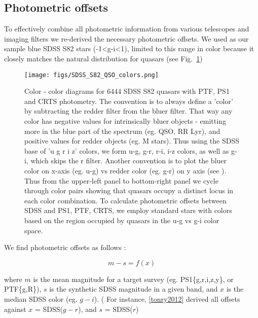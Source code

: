 \documentclass[fleqn,usenatbib]{mnras}  %
\begin{document}
\subsection{Photometric offsets}

To effectively combine all photometric information from various telescopes and imaging filters we re-derived the necessary photometric offsets. We used as our sample blue SDSS S82 stars (-1<g-i<1), limited to this range in color because it closely matches the natural distribution for quasars (see Fig.~\ref{fig:quasar_colors})


\begin{figure}
\texttt{[image: figs/SDSS\_S82\_QSO\_colors.png]}
\caption{Color - color diagrams for 6444 SDSS S82 quasars with PTF, PS1 and CRTS photometry. The convention is to always define a 'color' by subtracting the redder filter from the bluer filter. That way any color has negative values for intrinsically bluer objects - emitting more in the blue part of the spectrum (eg. QSO, RR Lyr), and positive values for redder objects (eg. M stars). Thus using the SDSS base of 'u g r i z' colors,  we form u-g, g-r,  r-i, i-z  colors, as well as g-i, which skips the r filter. Another convention is to plot the bluer color on x-axis (eg. u-g) vs redder color (eg. g-r) on y axis (see \citealt{ivezic2002,sesar2007}). Thus from the upper-left panel to bottom-right panel we cycle through color pairs showing that quasars occupy a distinct locus in each color combination. To calculate photometric offsets between SDSS and PS1, PTF, CRTS, we employ standard stars with colors based on the region occupied by quasars in the u-g vs g-i color space. }
\label{fig:quasar_colors}
\end{figure} 



We find photometric offsets as follows : 

\begin{equation}
m - s = f(x)
\end{equation}

where $m$ is the mean magnitude for a target survey (eg. PS1\{g,r,i,z,y\}, or PTF\{g,R\}),  $s$ is the synthetic SDSS magnitude in a given band, and $x$ is the median SDSS color (eg. $g-i$).   ( For instance, \ref{tonry2012} derived all offsets against $x$ = SDSS($g-r$), and $s$ = SDSS($r$)
\end{document}
